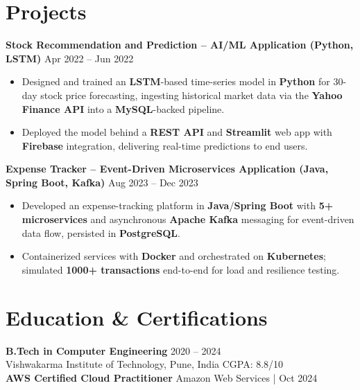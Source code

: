 \documentclass[a4paper,10pt]{article}
\begin{document}
\section*{Projects}

\textbf{Stock Recommendation and Prediction -- AI/ML Application (Python, LSTM)} \hfill Apr 2022 -- Jun 2022
\begin{itemize}[leftmargin=*]
    \item Designed and trained an \textbf{LSTM}-based time-series model in \textbf{Python} for 30-day stock price forecasting, ingesting historical market data via the \textbf{Yahoo Finance API} into a \textbf{MySQL}-backed pipeline.
    \item Deployed the model behind a \textbf{REST API} and \textbf{Streamlit} web app with \textbf{Firebase} integration, delivering real-time predictions to end users.
\end{itemize}

\textbf{Expense Tracker -- Event-Driven Microservices Application (Java, Spring Boot, Kafka)} \hfill Aug 2023 -- Dec 2023
\begin{itemize}[leftmargin=*]
    \item Developed an expense-tracking platform in \textbf{Java}/\textbf{Spring Boot} with \textbf{5+ microservices} and asynchronous \textbf{Apache Kafka} messaging for event-driven data flow, persisted in \textbf{PostgreSQL}.
    \item Containerized services with \textbf{Docker} and orchestrated on \textbf{Kubernetes}; simulated \textbf{1000+ transactions} end-to-end for load and resilience testing.
\end{itemize}

\section*{Education \& Certifications}
\textbf{B.Tech in Computer Engineering} \hfill 2020 -- 2024 \\
Vishwakarma Institute of Technology, Pune, India \hfill CGPA: 8.8/10 \\
\textbf{AWS Certified Cloud Practitioner} \hfill Amazon Web Services \;|\; Oct 2024
\end{document}
